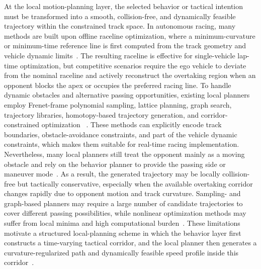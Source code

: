 \documentclass{iopjournal}
\begin{document}
At the local motion-planning layer, the selected behavior or tactical intention
must be transformed into a smooth, collision-free, and dynamically feasible
trajectory within the constrained track space. In autonomous racing, many
methods are built upon offline raceline optimization, where a minimum-curvature
or minimum-time reference line is first computed from the track geometry and
vehicle dynamic limits~\cite{christ2021time,heilmeier2020mincurv,
kapania2016sequential,lipp2014minimumtime,verschueren2014nmpc}. The resulting
raceline is effective for single-vehicle lap-time optimization, but competitive
scenarios require the ego vehicle to deviate from the nominal raceline and
actively reconstruct the overtaking region when an opponent blocks the apex or
occupies the preferred racing line. To handle dynamic obstacles and alternative
passing opportunities, existing local planners employ Frenet-frame polynomial
sampling, lattice planning, graph search, trajectory libraries, homotopy-based
trajectory generation, and corridor-constrained optimization
~\cite{werling2010frenet,ziegler2014baidu,betz2019architecture,
he2021parallelized,wischnewski2023tube}. These methods can explicitly encode
track boundaries, obstacle-avoidance constraints, and part of the vehicle
dynamic constraints, which makes them suitable for real-time racing
implementation. Nevertheless, many local planners still treat the opponent
mainly as a moving obstacle and rely on the behavior planner to provide the
passing side or maneuver mode~\cite{fridovich2020ilqgames,laine2023}. As a result, the generated trajectory may be
locally collision-free but tactically conservative, especially when the
available overtaking corridor changes rapidly due to opponent motion and track
curvature. Sampling- and graph-based planners may require a large number of
candidate trajectories to cover different passing possibilities, while
nonlinear optimization methods may suffer from local minima and high
computational burden~\cite{jung2023iac,kabzan2020amzracing}. These limitations motivate a structured local-planning
scheme in which the behavior layer first constructs a time-varying tactical
corridor, and the local planner then generates a curvature-regularized path
and dynamically feasible speed profile inside this corridor~\cite{wurman2022gtsophy,fuchs2021superhuman}.
\end{document}
